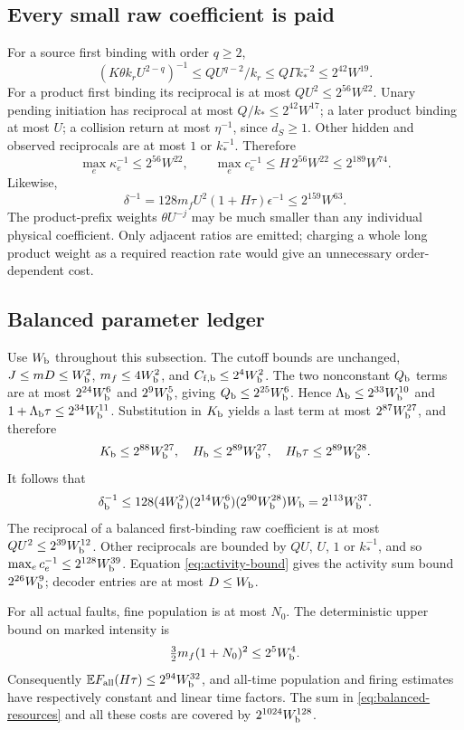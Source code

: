 \documentclass[11pt,reqno]{amsart}
\theoremstyle{definition}
\theoremstyle{remark}
\newcommand{\E}{\mathbb E}
\begin{document}
\subsection{Every small raw coefficient is paid}
For a source first binding with order $q\ge2$,
\[
 (K\theta k_rU^{2-q})^{-1}
 \le Q U^{q-2}/k_r
 \le Q\Gamma k_*^{-2}\le2^{42}W^{19}.
\]
For a product first binding its reciprocal is at most
$QU^2\le2^{56}W^{22}$. Unary pending initiation has reciprocal at most
$Q/k_*\le2^{42}W^{17}$; a later product binding at most $U$; a collision
return at most $\eta^{-1}$, since $d_S\ge1$. Other hidden and observed
reciprocals are at most $1$ or $k_*^{-1}$. Therefore
\[
 \max_e\kappa_e^{-1}\le2^{56}W^{22},\qquad
 \max_e c_e^{-1}\le H\,2^{56}W^{22}\le2^{189}W^{74}.
\]
Likewise,
\[
 \delta^{-1}=128m_fU^2(1+H\tau)\epsilon^{-1}
 \le2^{159}W^{63}.
\]
The product-prefix weights $\theta U^{-j}$ may be much smaller than any
individual physical coefficient. Only adjacent ratios are emitted; charging a
whole long product weight as a required reaction rate would give an
unnecessary order-dependent cost.

\subsection{Balanced parameter ledger}\label{app:balanced-ledger}
Use $W_{\rm b}$ throughout this subsection. The cutoff bounds are unchanged,
$J\le mD\le W_{\rm b}^2$, $m_f\le4W_{\rm b}^2$, and
$C_{{\rm f},\rm b}\le2^4W_{\rm b}^2$. The two nonconstant $Q_{\rm b}$
terms are at most $2^{24}W_{\rm b}^6$ and $2^9W_{\rm b}^5$, giving
$Q_{\rm b}\le2^{25}W_{\rm b}^6$. Hence
$\Lambda_{\rm b}\le2^{33}W_{\rm b}^{10}$ and
$1+\Lambda_{\rm b}\tau\le2^{34}W_{\rm b}^{11}$.
Substitution in $K_{\rm b}$ yields a last term at most
$2^{87}W_{\rm b}^{27}$, and therefore
\[
 K_{\rm b}\le2^{88}W_{\rm b}^{27},\quad
 H_{\rm b}\le2^{89}W_{\rm b}^{27},\quad
 H_{\rm b}\tau\le2^{89}W_{\rm b}^{28}.
\]
It follows that
\[
 \delta_{\rm b}^{-1}\le
 128(4W_{\rm b}^2)(2^{14}W_{\rm b}^6)
       (2^{90}W_{\rm b}^{28})W_{\rm b}
 =2^{113}W_{\rm b}^{37}.
\]
The reciprocal of a balanced first-binding raw coefficient is at most
$Q U^2\le2^{39}W_{\rm b}^{12}$. Other reciprocals are bounded by
$QU$, $U$, $1$ or $k_*^{-1}$, and so
$\max_e c_e^{-1}\le2^{128}W_{\rm b}^{39}$.
Equation \eqref{eq:activity-bound} gives the activity sum bound
$2^{26}W_{\rm b}^{9}$; decoder entries are at most $D\le W_{\rm b}$.

For all actual faults, fine population is at most $N_0$. The deterministic
upper bound on marked intensity is
\[
 \tfrac32m_f(1+N_0)^2\le2^5W_{\rm b}^4.
\]
Consequently $\E F_{\rm all}(H\tau)\le2^{94}W_{\rm b}^{32}$, and all-time
population and firing estimates have respectively constant and linear time
factors. The sum in \eqref{eq:balanced-resources} and all these costs are
covered by $2^{1024}W_{\rm b}^{128}$.
\end{document}
